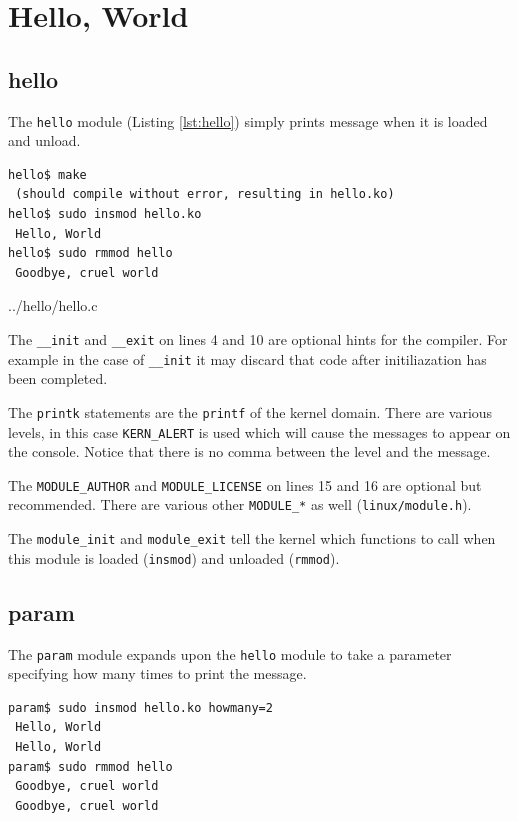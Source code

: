 \documentclass{article}
\begin{document}

\section{Hello, World}
\subsection{hello}

The \verb+hello+ module (Listing \ref{lst:hello}) simply prints message
when it is loaded and unload.

\begin{verbatim}
hello$ make
 (should compile without error, resulting in hello.ko)
hello$ sudo insmod hello.ko
 Hello, World
hello$ sudo rmmod hello
 Goodbye, cruel world
\end{verbatim}


	{../hello/hello.c}

The \verb+__init+ and \verb+__exit+ on lines 4 and 10
are optional hints for the compiler.  For example in the case of
\verb+__init+ it may discard that code after initiliazation
has been completed.

The \verb+printk+ statements are the \verb+printf+ of the
kernel domain.  There are various levels, in this case
\verb+KERN_ALERT+ is used which will cause the messages
to appear on the console.  Notice that there is no comma
between the level and the message.

The \verb+MODULE_AUTHOR+ and \verb+MODULE_LICENSE+ on lines 15 and 16
are optional but recommended.  There are various other \verb+MODULE_*+
as well (\verb+linux/module.h+).

The \verb+module_init+ and \verb+module_exit+ tell the kernel which
functions to call when this module is loaded (\verb+insmod+) and
unloaded (\verb+rmmod+).

\clearpage
\subsection{param}

The \verb+param+ module expands upon the \verb+hello+ module to
take a parameter specifying how many times to print the message.

\begin{verbatim}
param$ sudo insmod hello.ko howmany=2
 Hello, World
 Hello, World
param$ sudo rmmod hello
 Goodbye, cruel world
 Goodbye, cruel world
\end{verbatim}
\end{document}
